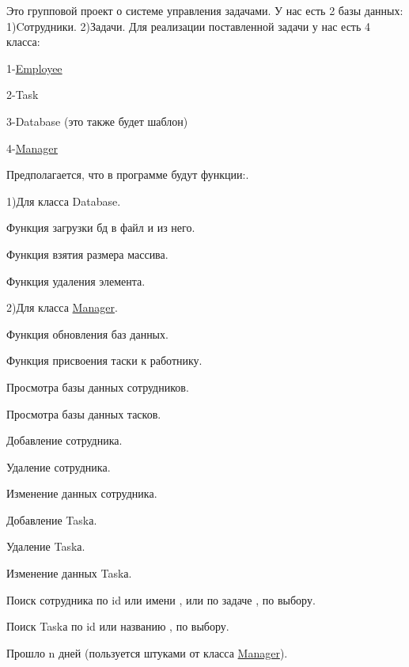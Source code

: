 Это групповой проект о системе управления задачами. У нас есть 2 базы данных\+: 1)Cотрудники. 2)Задачи. Для реализации поставленной задачи у нас есть 4 класса\+:
\begin{DoxyItemize}
\item 1-\/\mbox{\hyperlink{class_employee}{Employee}}
\item 2-\/Task
\item 3-\/Database (это также будет шаблон)
\item 4-\/\mbox{\hyperlink{class_manager}{Manager}}
\item 
\item Предполагается, что в программе будут функции\+:.
\item 1)Для класса Database.
\item Функция загрузки бд в файл и из него.
\item Функция взятия размера массива.
\item Функция удаления элемента.
\item 
\item 2)Для класса \mbox{\hyperlink{class_manager}{Manager}}.
\item Функция обновления баз данных.
\item Функция присвоения таски к работнику.
\item Просмотра базы данных сотрудников.
\item Просмотра базы данных тасков.
\item Добавление сотрудника.
\item Удаление сотрудника.
\item Изменение данных сотрудника.
\item Добавление Task\textquotesingle{}а.
\item Удаление Task\textquotesingle{}а.
\item Изменение данных Task\textquotesingle{}а.
\item Поиск сотрудника по id или имени , или по задаче , по выбору.
\item Поиск Task\textquotesingle{}а по id или названию , по выбору.
\item Прошло n дней (пользуется штуками от класса \mbox{\hyperlink{class_manager}{Manager}}). 
\end{DoxyItemize}